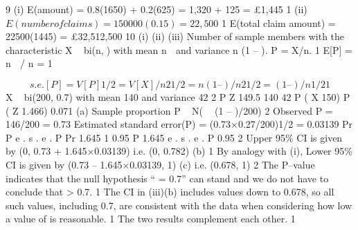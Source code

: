 \documentclass[a4paper,12pt]{article}
\begin{document}
9
(i) E(amount) = 0.8(1650) + 0.2(625) = 1,320 + 125 = £1,445 1
(ii) $E(number of claims) = 150000(0.15) = 22,500$ 1
E(total claim amount) = 22500(1445) = £32,512,500
10
(i)
(ii)
(iii)
Number of sample members with the characteristic X ~ bi(n,) with mean
n  and variance n (1 – ). P = X/n. 1
E[P] = n  / n = 1

\[s.e.[P] = {V[P]}1/2 = {V[X]/n 2}1/2 = {n (1 – )/n 2 }1/2 = { (1 – )/n}1/2 1\]
X ~ bi(200, 0.7) with mean 140 and variance 42 2
P Z
149.5 140
42
P ( X 150)
P ( Z
1.466) 0.071
(a) Sample proportion P ~ N(  (1 – )/200)
2
Observed P = 146/200 = 0.73
Estimated standard error(P) = (0.73×0.27/200)1/2 = 0.03139
Pr
P
e . s . e . P
Pr
1.645
1
0.95
P 1.645 e . s . e . P
0.95
2
Upper 95\% CI is given by (0, 0.73 + 1.645×0.03139)
i.e. (0, 0.782)
(b)
1
By analogy with (i),
Lower 95\% CI is given by (0.73 – 1.645×0.03139, 1)
(c)
i.e. (0.678, 1) 2
The P–value indicates that the null hypothesis “ = 0.7” can stand and we do not have to conclude that > 0.7. 1
The CI in (iii)(b) includes values down to 0.678, so all such values, including 0.7, are consistent with the data when considering how low a value of is reasonable. 1
The two results complement each other. 1
\end{document}
